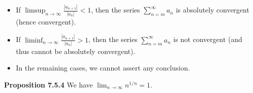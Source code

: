 \documentclass{article}
\begin{document}
\begin{itemize}
    \item If $\limsup_{n \to \infty} \frac{|a_{n+1}|}{|a_n|} < 1$, then the series
          $\sum_{n=m}^{\infty} a_n$ is absolutely convergent (hence convergent).

    \item If $\liminf_{n \to \infty} \frac{|a_{n+1}|}{|a_n|} > 1$, then the series
          $\sum_{n=m}^{\infty} a_n$ is not convergent (and thus cannot be absolutely
          convergent).

    \item In the remaining cases, we cannot assert any conclusion.
\end{itemize}


\medskip

\textbf{Proposition 7.5.4} We have
\(
\lim_{n \to \infty} n^{1/n} = 1.
\)
\end{document}
